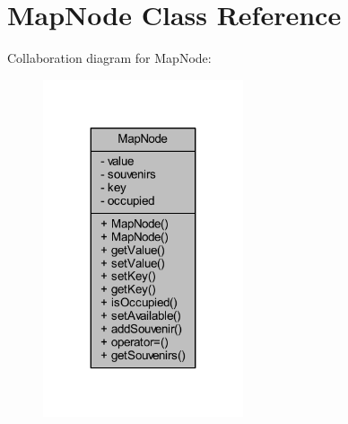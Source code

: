 \hypertarget{class_map_node}{}\section{Map\+Node Class Reference}
\label{class_map_node}


Collaboration diagram for Map\+Node\+:\nopagebreak
\begin{figure}[H]
\begin{center}
\leavevmode
\includegraphics[width=167pt]{class_map_node__coll__graph}
\end{center}
\end{figure}
